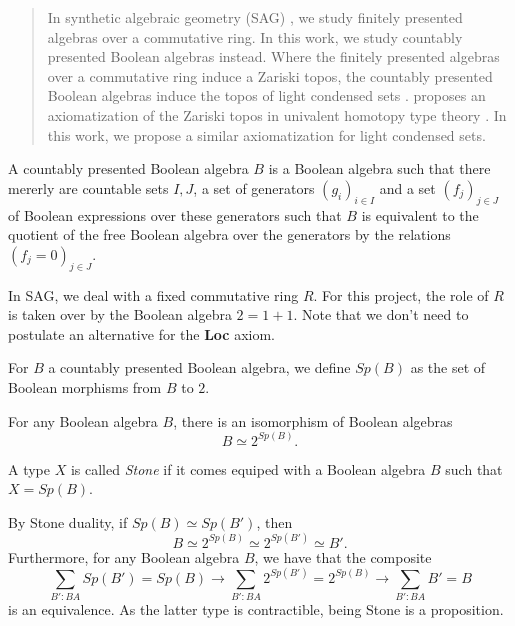 \begin{abstract}
In synthetic algebraic geometry (SAG) \cite{draft}, we study finitely presented algebras over a commutative ring. 
In this work, we study countably presented Boolean algebras instead. 
Where the finitely presented algebras over a commutative ring induce a Zariski topos, 
the countably presented Boolean algebras induce the topos of light condensed sets \cite{TODO}. 
\cite{draft} proposes an axiomatization of the Zariski topos in univalent homotopy type theory \cite{HoTT}. 
In this work, we propose a similar axiomatization for light condensed sets. 
\end{abstract} 

\begin{definition}
  A countably presented Boolean algebra $B$ is a Boolean algebra such that there mererly are countable sets $I,J$, 
  a set of generators $(g_i)_{i\in I}$ and a set $(f_j)_{j\in J}$ of Boolean expressions over these generators 
  such that $B$ is equivalent to the quotient of the free Boolean algebra over the generators by the relations
  $(f_j=0)_{j\in J}$. 
\end{definition} 


In SAG, we deal with a fixed commutative ring $R$. For this project, the role of $R$ is taken over by 
the Boolean algebra $2 = 1+1$. Note that we don't need to postulate an alternative for the \textbf{Loc} axiom. 


\begin{definition}
  For $B$ a countably presented Boolean algebra, we define $Sp(B)$ as the set of Boolean morphisms from $B$ to $2$. 
\end{definition}

\begin{axiom}
  For any Boolean algebra $B$, there
  is an isomorphism of Boolean algebras
  $$B\simeq  2^{Sp(B)}.$$ 
\end{axiom} 
\begin{definition}
  A type $X$ is called \textit{Stone} if it comes equiped with a Boolean algebra $B$ such that
  $X = Sp(B)$. 
\end{definition}
\begin{remark}
  By Stone duality, if $Sp(B) \simeq  Sp(B')$, then $$B \simeq 2^{Sp(B)} \simeq 2^{Sp(B')} \simeq B'.$$
  Furthermore, for any Boolean algebra $B$, we have that the composite
  $$ 
  \sum\limits_{B' : BA} Sp(B') = Sp(B) \to 
  \sum\limits_{B' : BA} 2^{Sp(B')} = 2^{Sp(B)} \to
  \sum\limits_{B' : BA} B' = B 
  $$ 
  is an equivalence. As the latter type is contractible, being Stone is a proposition. 
\end{remark} 

